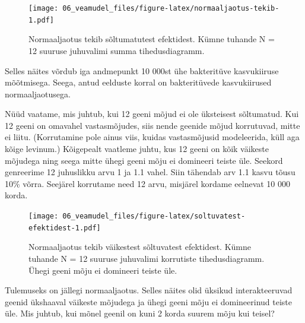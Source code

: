 \documentclass[]{book}
\newenvironment{Shaded}{\begin{snugshade}}{\end{snugshade}}
\newcommand{\KeywordTok}[1]{\textcolor[rgb]{0.13,0.29,0.53}{\textbf{#1}}}
\newcommand{\DecValTok}[1]{\textcolor[rgb]{0.00,0.00,0.81}{#1}}
\newcommand{\FloatTok}[1]{\textcolor[rgb]{0.00,0.00,0.81}{#1}}
\newcommand{\StringTok}[1]{\textcolor[rgb]{0.31,0.60,0.02}{#1}}
\newcommand{\OperatorTok}[1]{\textcolor[rgb]{0.81,0.36,0.00}{\textbf{#1}}}
\newcommand{\NormalTok}[1]{#1}
\begin{document}
\begin{figure}
\centering
\texttt{[image: 06\_veamudel\_files/figure-latex/normaaljaotus-tekib-1.pdf]}
\caption{\label{fig:normaaljaotus-tekib}Normaaljaotus tekib sõltumatutest efektidest.
Kümne tuhande N = 12 suuruse juhuvalimi summa tihedusdiagramm.}
\end{figure}

Selles näites võrdub iga andmepunkt 10 000st ühe bakteritüve
kasvukiiruse mõõtmisega. Seega, antud eelduste korral on bakteritüvede
kasvukiirused normaaljaotusega.

Nüüd vaatame, mis juhtub, kui 12 geeni mõjud ei ole üksteisest
sõltumatud. Kui 12 geeni on omavahel vastasmõjudes, siis nende geenide
mõjud korrutuvad, mitte ei liitu. (Korrutamine pole ainus viis, kuidas
vastasmõjusid modeleerida, küll aga kõige levinum.) Kõigepealt vaatleme
juhtu, kus 12 geeni on kõik väikeste mõjudega ning seega mitte ühegi
geeni mõju ei domineeri teiste üle. Seekord genreerime 12 juhuslikku
arvu 1 ja 1.1 vahel. Siin tähendab arv 1.1 kasvu tõusu 10\% võrra.
Seejärel korrutame need 12 arvu, misjärel kordame eelnevat 10 000 korda.





\begin{Shaded}
\end{Shaded}

\begin{figure}
\centering
\texttt{[image: 06\_veamudel\_files/figure-latex/soltuvatest-efektidest-1.pdf]}
\caption{\label{fig:soltuvatest-efektidest}Normaaljaotus tekib väikestest sõltuvatest
efektidest. Kümne tuhande N = 12 suuruse juhuvalimi korrutiste
tihedusdiagramm. Ühegi geeni mõju ei domineeri teiste üle.}
\end{figure}

Tulemuseks on jällegi normaaljaotus. Selles näites olid üksikud
interakteeruvad geenid ükshaaval väikeste mõjudega ja ühegi geeni mõju
ei domineerinud teiste üle. Mis juhtub, kui mõnel geenil on kuni 2 korda
suurem mõju kui teisel?
\end{document}
